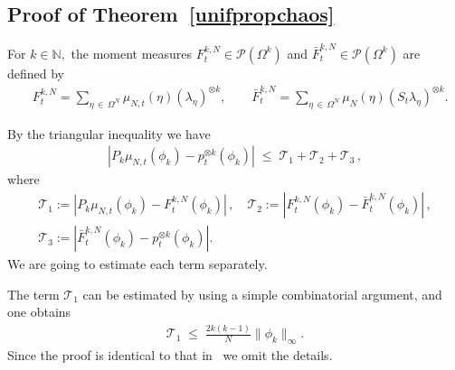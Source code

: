 \documentclass[10pt,a4paper]{article}
\renewcommand{\leq}{\;\leqslant\;}
\newcommand{\Om}{\Omega}
\newcommand{\cP}{\mathcal{P}}
\newcommand{\cT}{\mathcal{T}}
\newcommand{\bbN}{\mathbb{N}}
\let\O=\Omega
\begin{document}
\subsection{Proof of Theorem~\ref{unifpropchaos}}

For $k \in \bbN,$ the moment measures $F_t^{k,N}\in\cP(\O^k)$ and $\bar{F}_t^{k,N}\in\cP(\O^k)$ are defined by
\begin{align}
&F_t^{k,N} =\sum_{\eta\,\in\,\Om^N}
\mu_{N,t}(\eta)(\lambda_{\eta})^{\otimes k}, \qquad
\bar F_t^{k,N} = \sum_{\eta\,\in\,\Om^N}
\mu_{N}(\eta)(S_t\lambda_{\eta})^{\otimes k}.
\end{align}

By the triangular inequality we have
\begin{align}\label{labo}
\left|P_k\mu_{N,t}(\phi_k)-p_t^{\otimes k}(\phi_k)\right|\leq \cT_1 + \cT_2 + \cT_3\,,
\end{align}
where
\begin{equation}\label{labt}
\begin{gathered}
\cT_1:=\left|P_k\mu_{N,t}(\phi_k)-F_t^{k,N}(\phi_k)\right| \,,\quad\cT_2:= \left|F_t^{k,N}(\phi_k)-\bar{F}_t^{k,N}(\phi_k)\right|\,,\\
\cT_3:= \left|\bar{F}_t^{k,N}(\phi_k)-p_t^{\otimes k}(\phi_k)\right|.
\end{gathered}
\end{equation}
We are going to estimate each term separately.

The term $\cT_1$ can be estimated by using a simple combinatorial argument, and one obtains
\begin{align}\label{labt1}
\cT_1 \leq \frac{2k(k-1)}{N}\|\phi_k\|_{\infty}.
\end{align}
Since the proof is identical to that in~\cite[Lemma~3.11]{revchaos} we omit the details.
\end{document}
